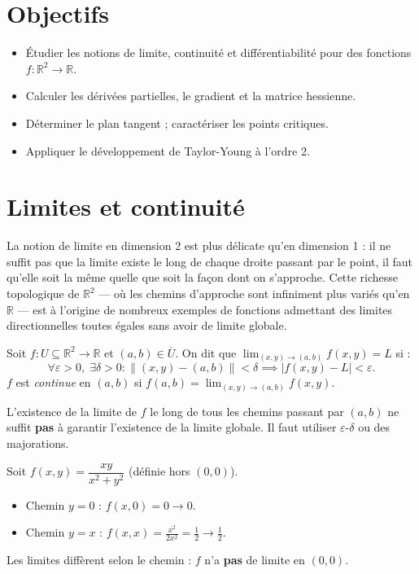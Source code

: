 \documentclass[11pt,a4paper,twoside]{book}
\newcommand{\R}{\mathbb{R}}
\begin{document}
\section*{Objectifs}
\begin{itemize}[leftmargin=1.5em]
  \item Étudier les notions de limite, continuité et différentiabilité pour des fonctions $f : \R^2 \to \R$.
  \item Calculer les dérivées partielles, le gradient et la matrice hessienne.
  \item Déterminer le plan tangent ; caractériser les points critiques.
  \item Appliquer le développement de Taylor-Young à l'ordre 2.
\end{itemize}

\section{Limites et continuité}

La notion de limite en dimension 2 est plus délicate qu'en dimension 1 : il ne suffit pas que la limite existe le long de chaque droite passant par le point, il faut qu'elle soit la même quelle que soit la façon dont on s'approche. Cette richesse topologique de $\mathbb{R}^2$ — où les chemins d'approche sont infiniment plus variés qu'en $\mathbb{R}$ — est à l'origine de nombreux exemples de fonctions admettant des limites directionnelles toutes égales sans avoir de limite globale.

\begin{definitionbox}
Soit $f : U \subseteq \R^2 \to \R$ et $(a,b) \in \overline{U}$.
On dit que $\lim_{(x,y)\to(a,b)} f(x,y) = L$ si :
\[
  \forall \varepsilon > 0,\; \exists \delta > 0 : \|(x,y)-(a,b)\| < \delta \implies |f(x,y) - L| < \varepsilon.
\]
$f$ est \emph{continue} en $(a,b)$ si $f(a,b) = \lim_{(x,y)\to(a,b)} f(x,y)$.
\end{definitionbox}

\begin{erreurbox}
L'existence de la limite de $f$ le long de tous les chemins passant par $(a,b)$ ne suffit
\textbf{pas} à garantir l'existence de la limite globale. Il faut utiliser $\varepsilon$-$\delta$ ou des majorations.
\end{erreurbox}

\begin{exemplebox}
Soit $f(x,y) = \dfrac{xy}{x^2+y^2}$ (définie hors $(0,0)$).
\begin{itemize}
  \item Chemin $y = 0$ : $f(x,0) = 0 \to 0$.
  \item Chemin $y = x$ : $f(x,x) = \frac{x^2}{2x^2} = \frac{1}{2} \to \frac{1}{2}$.
\end{itemize}
Les limites diffèrent selon le chemin : $f$ n'a \textbf{pas} de limite en $(0,0)$.
\end{exemplebox}
\end{document}
